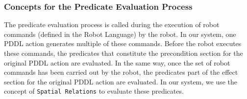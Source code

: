 

\subsubsection{Concepts for the Predicate Evaluation Process}
The predicate evaluation process is called during the execution of robot commands (defined in the Robot Language) by the robot. In our system, one PDDL action generates multiple of these commands. Before the robot executes these commands, the predicates that constitute the precondition section for the original PDDL action are evaluated. In the same way, once the set of robot commands has been carried out by the robot, the predicates part of the effect section for the original PDDL action are evaluated. In our system, we use the concept of \texttt{Spatial Relations} to evaluate these predicates.

